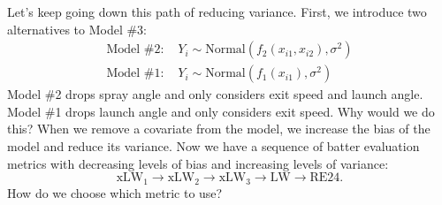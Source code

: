 \documentclass{article}
\begin{document}
    Let's keep going down this path of reducing variance. First, we introduce two alternatives to Model \#3:
    \begin{align*}
      \mbox{Model \#2: }&Y_i \sim \mbox{Normal}\left(f_2(x_{i1}, x_{i2}), \sigma^2\right)\\
      \mbox{Model \#1: }&Y_i \sim \mbox{Normal}\left(f_1(x_{i1}), \sigma^2\right)
    \end{align*}
    Model \#2 drops spray angle and only considers exit speed and launch angle. Model \#1 drops launch angle and only considers exit speed. Why would we do this? When we remove a covariate from the model, we increase the bias of the model and reduce its variance. Now we have a sequence of batter evaluation metrics with decreasing levels of bias and increasing levels of variance:
    \begin{equation*}
      \mbox{xLW}_1 \rightarrow \mbox{xLW}_2 \rightarrow \mbox{xLW}_3 \rightarrow \mbox{LW} \rightarrow \mbox{RE24}.
    \end{equation*}
    How do we choose which metric to use?
\end{document}
